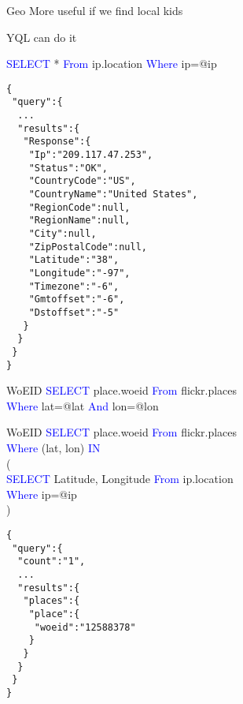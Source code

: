 \documentclass{beamer}
\begin{document}
\begin{frame}{Geo}
More useful if we find local kids
\end{frame}

\begin{frame}{YQL can do it}
  \begin{center}
  \textcolor{blue}{SELECT} * \textcolor{blue}{From} ip.location \textcolor{blue}{Where} ip=@ip
  \end{center}
\end{frame}

\begin{frame}[fragile]{}
\begin{verbatim}
{
 "query":{
  ...
  "results":{
   "Response":{
    "Ip":"209.117.47.253",
    "Status":"OK",
    "CountryCode":"US",
    "CountryName":"United States",
    "RegionCode":null,
    "RegionName":null,
    "City":null,
    "ZipPostalCode":null,
    "Latitude":"38",
    "Longitude":"-97",
    "Timezone":"-6",
    "Gmtoffset":"-6",
    "Dstoffset":"-5"
   }
  }
 }
}
\end{verbatim}
\end{frame}

\begin{frame}{WoEID}
  \textcolor{blue}{SELECT} place.woeid \textcolor{blue}{From} flickr.places \\ \textcolor{blue}{Where} lat=@lat \textcolor{blue}{And} lon=@lon
\end{frame}

\begin{frame}{WoEID}
  \textcolor{blue}{SELECT} place.woeid \textcolor{blue}{From} flickr.places \\ \textcolor{blue}{Where} (lat, lon) \textcolor{blue}{IN} \\ ( \\ 
  \textcolor{blue}{SELECT} Latitude, Longitude \textcolor{blue}{From} ip.location \\ \textcolor{blue}{Where} ip=@ip \\ )
\end{frame}

\begin{frame}[fragile]{}
\begin{verbatim}
{
 "query":{
  "count":"1",
  ...
  "results":{
   "places":{
    "place":{
     "woeid":"12588378"
    }
   }
  }
 }
}
\end{verbatim}
\end{frame}
\end{document}
